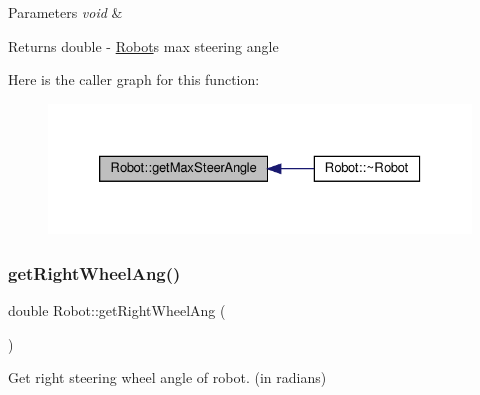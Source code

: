 \begin{DoxyParams}{Parameters}
{\em void} & \\
\hline
\end{DoxyParams}
\begin{DoxyReturn}{Returns}
double -\/ \hyperlink{classRobot}{Robot}\textquotesingle{}s max steering angle 
\end{DoxyReturn}
Here is the caller graph for this function\+:
\nopagebreak
\begin{figure}[H]
\begin{center}
\leavevmode
\includegraphics[width=326pt]{classRobot_ad51f91ba00dfe4efa1bf0a10ea3213e6_icgraph}
\end{center}
\end{figure}
\mbox{\label{classRobot_aaa3dd6bad00b406b62bb58af2dd37ca4}} 
\subsubsection{\texorpdfstring{get\+Right\+Wheel\+Ang()}{getRightWheelAng()}}
{\footnotesize\ttfamily double Robot\+::get\+Right\+Wheel\+Ang (\begin{DoxyParamCaption}{ }\end{DoxyParamCaption})}



Get right steering wheel angle of robot. (in radians) 


